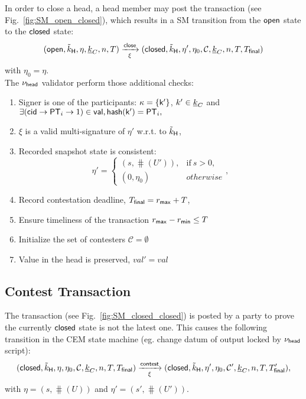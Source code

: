 

In order to close a head, a head member may post the \mtxClose{} transaction (see Fig.~\ref{fig:SM_open_closed}), which results in a SM transition
from the $\mathsf{open}$ state to the $\mathsf{closed}$ state:
$$
(\mathsf{open},\tilde{k}_{\mathsf{H}},\eta,\underline{k}_C,n,T) \xrightarrow[\xi]{\mathsf{close}} (\mathsf{closed},\tilde{k}_{\mathsf{H}},\eta',\eta_0,\mathcal{C},\underline{k}_C,n,T,T_{\mathsf{final}}) 
$$
with $\eta_0 = \eta$. \\

\noindent The $\nu_\mathsf{head}$ validator perform those additional checks:
\begin{enumerate}
  \item Signer is one of the participants: $\kappa = \{\mathsf{k'}\}$, $k' \in \underline{k}_C$ and
    $
    \exists (\mathsf{cid} \rightarrow \mathsf{PT}_i \rightarrow 1) \in \mathsf{val}, \mathsf{hash}(\mathsf{k'}) = \mathsf{PT}_i,
    $
  \item $\xi$ is a valid multi-signature of $\eta'$ w.r.t. to $\tilde{k}_{\mathsf{H}}$,
  \item Recorded snapshot state is consistent:
    $$
    \eta' = \left\{\begin{array}{ll}
         (s, \hash(U')), & \mathrm{if}\ s > 0,\\
         (0, \eta_0) & \mathit{otherwise} 
    \end{array}\right.,
    $$
  \item Record contestation deadline, $T_{\mathsf{final}} = r_{\mathsf{max}} + T$,
  \item Ensure timeliness of the transaction $r_{\mathsf{max}} - r_{\mathsf{min}} \leq T$ 
  \item Initialize the set of contesters $\mathcal{C} = \emptyset$
  \item Value in the head is preserved, $val' = val$
\end{enumerate}

\subsection{Contest Transaction}\label{sec:contest-tx}



The \mtxContest{} transaction (see
Fig.~\ref{fig:SM_closed_closed}) is posted by a party to prove the currently $\mathsf{closed}$ state is not the latest one. This causes the following transition in the CEM state machine (eg. change datum of output locked by $\nu_\mathsf{head}$ script):
$$
   (\mathsf{closed},\tilde{k}_{\mathsf{H}},\eta,\eta_0,\mathcal{C},\underline{k}_C,n,T,T_{\mathsf{final}}) \xrightarrow[\xi]{\mathsf{contest}} (\mathsf{closed},\tilde{k}_{\mathsf{H}},\eta',\eta_0,\mathcal{C}', \underline{k}_C,n,T,T_{\mathsf{final}}'),
$$
with $\eta = (s, \hash(U))$ and $\eta' = (s', \hash(U')).$ \\


